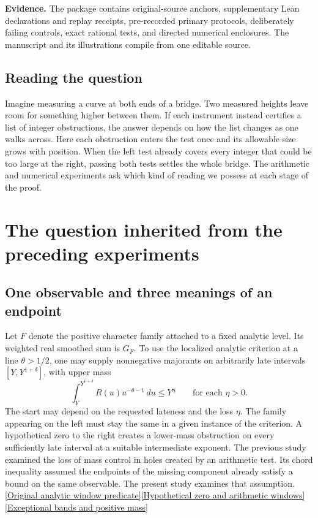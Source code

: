 \documentclass[12pt,letterpaper]{article}
\begin{document}
\medskip\textbf{Evidence.} The package contains original-source anchors, supplementary Lean declarations and replay receipts, pre-recorded primary protocols, deliberately failing controls, exact rational tests, and directed numerical enclosures. The manuscript and its illustrations compile from one editable source.
\clearpage\tableofcontents
\medskip\subsection*{Reading the question}
Imagine measuring a curve at both ends of a bridge. Two measured heights leave room for something higher between them. If each instrument instead certifies a list of integer obstructions, the answer depends on how the list changes as one walks across. Here each obstruction enters the test once and its allowable size grows with position. When the left test already covers every integer that could be too large at the right, passing both tests settles the whole bridge. The arithmetic and numerical experiments ask which kind of reading we possess at each stage of the proof.
\section{The question inherited from the preceding experiments}
\subsection{One observable and three meanings of an endpoint}
Let \(F\) denote the positive character family attached to a fixed analytic level. Its weighted real smoothed sum is \(G_F\). To use the localized analytic criterion at a line \(\theta>1/2\), one may supply nonnegative majorants on arbitrarily late intervals \([Y,Y^{1+\delta}]\), with upper mass
\[
 \int_Y^{Y^{1+\delta}} R(u)u^{-\theta-1}\,du\le Y^\eta
 \qquad\text{for each }\eta>0 .
\]
The start may depend on the requested lateness and the loss \(\eta\). The family appearing on the left must stay the same in a given instance of the criterion. A hypothetical zero to the right creates a lower-mass obstruction on every sufficiently late interval at a suitable intermediate exponent. The previous study examined the loss of mass control in holes created by an arithmetic test. Its chord inequality assumed the endpoints of the missing component already satisfy a bound on the same observable. The present study examines that assumption. \href{https://github.com/nousentllc/riemann-hypothesis/blob/40e56bab026552e089d7afcfeff08d2defb9c005/src/Development/AutomorphicArithmetic/DedekindLFunctions/CharFamily.lean#L41-L45}{[Original analytic window predicate]}\quad\href{https://github.com/nousentllc/riemann-hypothesis/pull/16}{[Hypothetical zero and arithmetic windows]}\quad\href{https://github.com/nousentllc/riemann-hypothesis/pull/17}{[Exceptional bands and positive mass]}
\end{document}
